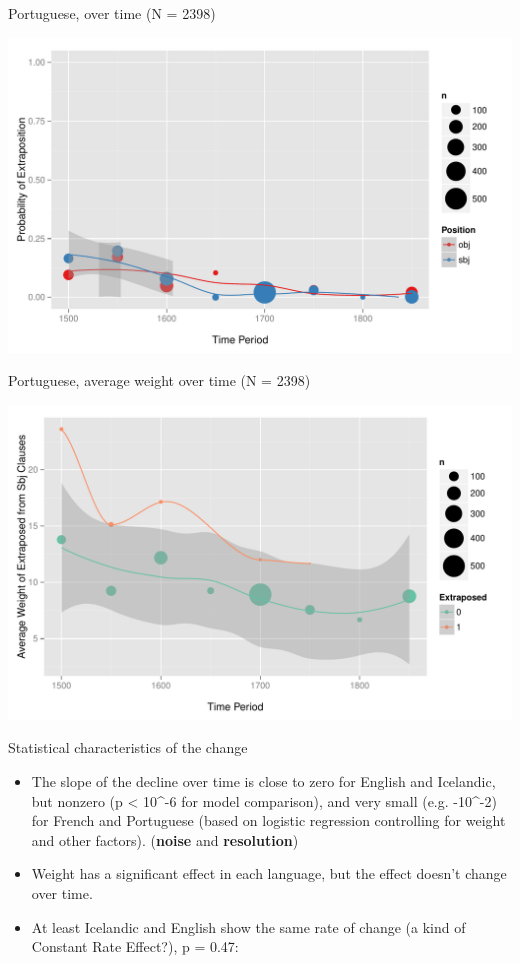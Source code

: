 \documentclass[hyperref={pdfpagelabels=false}]{beamer}
\begin{document}
\begin{frame}{Portuguese, over time (N = 2398)}

\begin{center}
\includegraphics[width=1.1\textwidth]{exSbjObjYearBinned50Loessport.pdf}
\end{center}
\end{frame}


\begin{frame}{Portuguese, average weight over time (N = 2398)}

\begin{center}
\includegraphics[width=1.1\textwidth]{exWeightYearBinned50Loessport.pdf}
\end{center}
\end{frame}

\begin{frame}{Statistical characteristics of the change}
    \begin{itemize}
    	\item The slope of the decline over time is close to zero for English and Icelandic, but nonzero (p < 10^{-6} for model comparison), and very small (e.g. -10^{-2}) for French and Portuguese (based on logistic regression controlling for weight and other factors). (\textbf{noise} and \textbf{resolution})
	\item Weight has a significant effect in each language, but the effect doesn't change over time.
	\item At least Icelandic and English show the same rate of change (a kind of Constant Rate Effect?), p = 0.47:
\end{itemize}
\end{frame}
\end{document}
